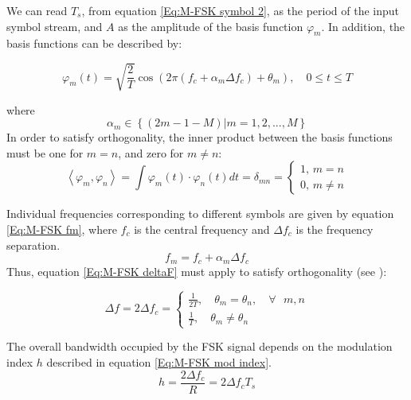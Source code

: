 \documentclass[12pt,a4paper,openright]{report}
\begin{document}
We can read $T_s$, from equation \ref{Eq:M-FSK symbol 2}, as the period of the input symbol stream, and $A$ as the amplitude of the basis function $\varphi_m$. In addition, the basis functions can be described by:

\begin{equation}\label{Eq:M-FSK basis}
{\varphi _m}(t) = \sqrt {\frac{2}{T}} \cos \left( {2\pi ({f_c} + {\alpha _m}\Delta {f_c}) + {\theta _m}} \right), \quad 0 \le t \le T
\end{equation}

where \[
{\alpha _m} \in \left\{ {(2m - 1 - M) | m = 1,2,...,M} \right\}
\] 
In order to satisfy orthogonality, the inner product between the basis functions must be one for $m=n$, and zero for $m\neq n$:
\begin{equation}\label{Eq:M-FSK inner product}
\left\langle {\left. {{\varphi _m},{\varphi _n}} \right\rangle } \right. = \int {{\varphi _m}(t)\cdot {\varphi _n}(t)dt = {\delta _{mn}} = \left\{ \begin{array}{l}
1\text{, }m = n\\
0\text{, }m \ne n
\end{array} \right.}
\end{equation} 


Individual frequencies corresponding to different symbols are given by equation \ref{Eq:M-FSK fm}, where $f_c$ is the central frequency and $\Delta f_c$ is the frequency separation.\\
\begin{equation}\label{Eq:M-FSK fm}
{f_m} = {f_c} + {\alpha _m}\Delta {f_c}
\end{equation}
Thus, equation \ref{Eq:M-FSK deltaF} must apply to satisfy orthogonality (see \cite{gold}):

\begin{equation}\label{Eq:M-FSK deltaF}
\Delta {f}= 2\Delta {f_c} = \left\{ \begin{array}{l}
\frac{1}{{2T}}, \quad {\theta _m} = {\theta _n}, \quad \forall\text{ } m,n\\
\frac{1}{T}, \quad {\theta _m} \ne {\theta _n}
\end{array} \right.
\end{equation}

The overall bandwidth occupied by the FSK signal depends on the modulation index $h$ described in equation \ref{Eq:M-FSK mod index}.
\begin{equation}\label{Eq:M-FSK mod index}
h=\frac{2\Delta {f_c}}{R}=2\Delta {f_c}T_s 
\end{equation}
\end{document}
